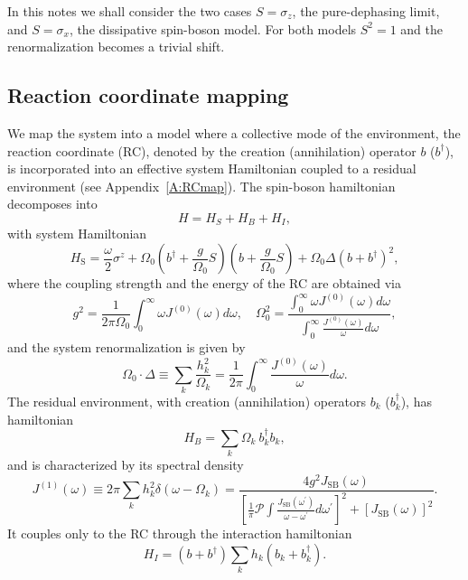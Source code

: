 \documentclass[%
preprint,
onecolumn,
notitlepag,
 amsmath,amssymb,
 aps,
 pra,
]{revtex4-2}
\begin{document}
In this notes we shall consider the two cases $S = \sigma_{z}$, the pure-dephasing limit, and $S = \sigma_{x}$, the dissipative spin-boson model. For both models $S^2 =1$ and the renormalization becomes a trivial shift.

\subsection{Reaction coordinate mapping}

We map the system  into a model where a collective mode of the environment, the reaction coordinate (RC), denoted by the creation (annihilation) operator $b$ ($b^{\dag}$), is incorporated into an effective system Hamiltonian coupled to a residual environment (see Appendix~\ref{A:RCmap}). The spin-boson hamiltonian decomposes into
\begin{equation}
H = H_{S} + H_{B} + H_{I},
\end{equation}
with system Hamiltonian
\begin{equation}
H_{\text{S}}=\frac{\omega}{2} \sigma^{z}+\Omega_{0}\left(b^{\dagger}+\frac{g}{\Omega_{0}} S\right)\left(b+\frac{g}{\Omega_{0}} S\right)+ \Omega_{0} \Delta (b + b^{\dag})^{2},
\end{equation}
where the coupling strength and the energy of the RC are obtained via
\begin{equation}
g^{2}=\frac{1}{2 \pi \Omega_{0}} \int_{0}^{\infty} \omega J^{(0)}(\omega) d \omega, 
\quad
\Omega_{0}^{2}=\frac{\int_{0}^{\infty} \omega J^{(0)}(\omega) d \omega}{\int_{0}^{\infty} \frac{J^{(0)}(\omega)}{\omega} d \omega},
\end{equation} 
and the system renormalization is given by
\begin{equation}
\Omega_{0} \cdot \Delta \equiv \sum_{k} \frac{h_{k}^{2}}{\Omega_{k}}=\frac{1}{2 \pi} \int_{0}^{\infty} \frac{J^{(0)}(\omega)}{\omega} d \omega.
\end{equation}
The residual environment, with creation (annihilation) operators $b_{k}$ ($b_{k}^{\dag}$),  has hamiltonian
\begin{equation}
H_{B}= \sum_{k} \Omega_{k}\ b_{k}^{\dagger} b_{k}, 
\end{equation}
and is characterized by its spectral density
\begin{equation}
J^{(1)}(\omega) \equiv 2 \pi \sum_{k} h_k^2 \delta(\omega-\Omega_k) = \frac{4 g^{2} J_{\text{SB}}(\omega)}{\left[\frac{1}{\pi} \mathcal{P} \int \frac{J_{\text{SB}}\left(\omega^{\prime}\right)}{\omega-\omega^{\prime}} d \omega^{\prime}\right]^{2}+\left[J_{\text{SB}}(\omega)\right]^{2}}.
\end{equation}
It couples only to the RC through the interaction hamiltonian
\begin{equation}
H_{I} = (b + b^{\dag}) \sum_{k} h_{k} (b_{k} + b_{k}^{\dagger}). 
\end{equation}
\end{document}
